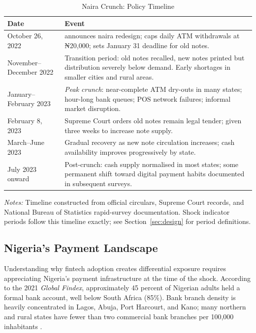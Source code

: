 \begin{table}[H]
\begin{threeparttable}
\caption{Naira Crunch: Policy Timeline}
\label{tab:shock_timeline}
\small
\begin{tabularx}{\textwidth}{lX}
\toprule
\textbf{Date} & \textbf{Event} \\
\midrule
October 26, 2022
  & \CBN{} announces naira redesign; caps daily ATM withdrawals
    at ₦20,000; sets January 31 deadline for old notes. \\[4pt]
November--December 2022
  & Transition period: old notes recalled, new notes printed but
    distribution severely below demand. Early shortages in
    smaller cities and rural areas. \\[4pt]
January--February 2023
  & \emph{Peak crunch}: near-complete ATM dry-outs in many states;
    hour-long bank queues; POS network failures; informal market
    disruption. \\[4pt]
February 8, 2023
  & Supreme Court orders old notes remain legal tender;
    \CBN{} given three weeks to increase note supply. \\[4pt]
March--June 2023
  & Gradual recovery as new note circulation increases;
    cash availability improves progressively by state. \\[4pt]
July 2023 onward
  & Post-crunch: cash supply normalised in most states;
    some permanent shift toward digital payment habits
    documented in subsequent surveys. \\
\bottomrule
\end{tabularx}
\begin{tablenotes}
\footnotesize
\item \textit{Notes:} Timeline constructed from \CBN{} official
  circulars, Supreme Court records, and National Bureau of Statistics
  rapid-survey documentation. Shock indicator periods follow this
  timeline exactly; see Section~\ref{sec:design} for period definitions.
\end{tablenotes}
\end{threeparttable}
\end{table}

\subsection{Nigeria's Payment Landscape}
\label{sub:payment_landscape}

Understanding why fintech adoption creates differential exposure
requires appreciating Nigeria's payment infrastructure at the time of
the shock. According to the 2021 \emph{Global Findex}, approximately
45 percent of Nigerian adults held a formal bank account, well below
South Africa (85\%).
Bank branch density is heavily concentrated in Lagos, Abuja, Port
Harcourt, and Kano; many northern and rural states have fewer than
two commercial bank branches per 100,000 inhabitants \citep{IMF2022FAS}.

